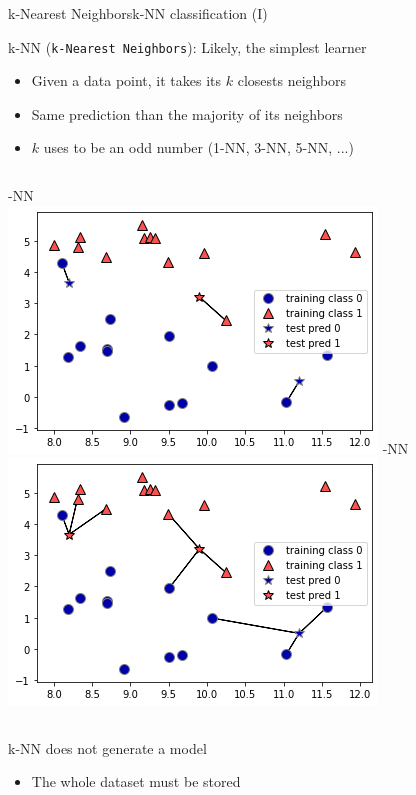 \documentclass[10pt,compress]{beamer} %
\begin{document}
\begin{frame}{k-Nearest Neighbors}{k-NN classification (I)}

     k-NN (\texttt{k-Nearest Neighbors}): Likely, the simplest learner
	\begin{itemize}
		\item Given a data point, it takes its $k$ closests neighbors
		\item Same prediction than the majority of its neighbors
        \item $k$ uses to be an odd number (1-NN, 3-NN, 5-NN, ...)
	\end{itemize}

    \begin{columns}
        -NN\\
	        \includegraphics[width=\textwidth]{figs/1-nn.png}
         -NN\\
	        \includegraphics[width=\textwidth]{figs/3-nn.png}
    \end{columns}

    k-NN does not generate a model
    \begin{itemize}
		\item The whole dataset must be stored
	\end{itemize}
\end{frame}
\end{document}
